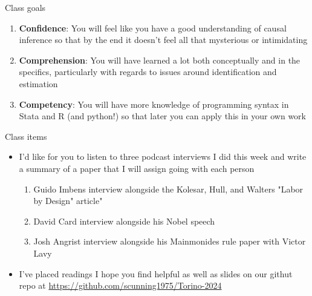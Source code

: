 \documentclass{beamer}
\begin{document}
\begin{frame}{Class goals}

  \begin{enumerate}
    \item \textbf{Confidence}: You will feel like you have a good understanding of causal inference so that by the end it doesn't feel all that mysterious or intimidating
    \item \textbf{Comprehension}: You will have learned a lot both conceptually and in the specifics, particularly with regards to issues around identification and estimation
    \item \textbf{Competency}: You will have more knowledge of programming syntax in Stata and R (and python!) so that later you can apply this in your own work
  \end{enumerate}

\end{frame}







\begin{frame}{Class items}

  \begin{itemize}
    \item I'd like for you to listen to three podcast interviews I did this week and write a summary of a paper that I will assign going with each person
    	\begin{enumerate}
	\item Guido Imbens interview alongside the Kolesar, Hull, and Walters "Labor by Design" article"
	\item David Card interview alongside his Nobel speech
	\item Josh Angrist interview alongside his Mainmonides rule paper with Victor Lavy
	\end{enumerate}
\item I've placed readings I hope you find helpful as well as slides on our githut repo at \url{https://github.com/scunning1975/Torino-2024}
  \end{itemize}

\end{frame}
\end{document}
